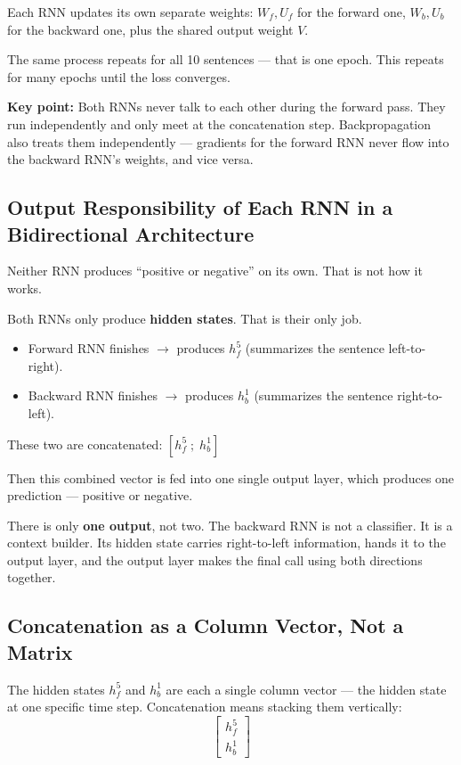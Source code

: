 \documentclass[12pt,a4paper]{article}
\begin{document}
Each RNN updates its own separate weights: $W_f, U_f$ for the forward one, $W_b, U_b$ for the backward one, plus the shared output weight $V$.

The same process repeats for all 10 sentences --- that is one epoch. This repeats for many epochs until the loss converges.

\textbf{Key point:} Both RNNs never talk to each other during the forward pass. They run independently and only meet at the concatenation step. Backpropagation also treats them independently --- gradients for the forward RNN never flow into the backward RNN's weights, and vice versa.


\subsection{Output Responsibility of Each RNN in a Bidirectional Architecture}

Neither RNN produces ``positive or negative'' on its own. That is not how it works.

Both RNNs only produce \textbf{hidden states}. That is their only job.

\begin{itemize}
    \item Forward RNN finishes $\rightarrow$ produces $h_f^5$ (summarizes the sentence left-to-right).
    \item Backward RNN finishes $\rightarrow$ produces $h_b^1$ (summarizes the sentence right-to-left).
\end{itemize}

These two are concatenated: $[h_f^5 \; ; \; h_b^1]$

Then this combined vector is fed into one single output layer, which produces one prediction --- positive or negative.

There is only \textbf{one output}, not two. The backward RNN is not a classifier. It is a context builder. Its hidden state carries right-to-left information, hands it to the output layer, and the output layer makes the final call using both directions together.


\subsection{Concatenation as a Column Vector, Not a Matrix}

The hidden states $h_f^5$ and $h_b^1$ are each a single column vector --- the hidden state at one specific time step. Concatenation means stacking them vertically:
\[
\begin{bmatrix} h_f^5 \\ h_b^1 \end{bmatrix}
\]
\end{document}
